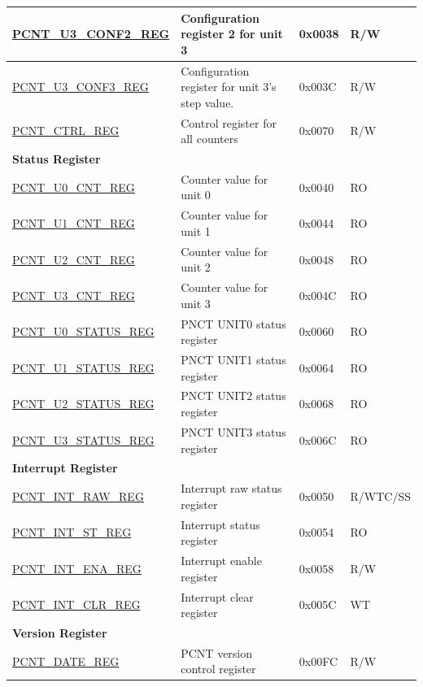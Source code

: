 \begin{longtable}{ | p{6cm} | p{7.2cm} | p{1.3cm} | p{1cm} | }
\hyperref[regdesc:PCNTUNCONF2REG]{PCNT\_U3\_CONF2\_REG} & Configuration register 2 for unit 3 & 0x0038 & R/W \\ \hline
\hyperref[regdesc:PCNTUNCONF3REG]{PCNT\_U3\_CONF3\_REG} & Configuration register for unit 3's step value. & 0x003C & R/W \\ \hline
\hyperref[regdesc:PCNTCTRLREG]{PCNT\_CTRL\_REG} & Control register for all counters & 0x0070 & R/W \\ \hline
\multicolumn{4}{|l|}{\textbf{Status Register}} \\ \hline
\hyperref[regdesc:PCNTUNCNTREG]{PCNT\_U0\_CNT\_REG} & Counter value for unit 0 & 0x0040 & RO \\ \hline
\hyperref[regdesc:PCNTUNCNTREG]{PCNT\_U1\_CNT\_REG} & Counter value for unit 1 & 0x0044 & RO \\ \hline
\hyperref[regdesc:PCNTUNCNTREG]{PCNT\_U2\_CNT\_REG} & Counter value for unit 2 & 0x0048 & RO \\ \hline
\hyperref[regdesc:PCNTUNCNTREG]{PCNT\_U3\_CNT\_REG} & Counter value for unit 3 & 0x004C & RO \\ \hline
\hyperref[regdesc:PCNTUNSTATUSREG]{PCNT\_U0\_STATUS\_REG} & PNCT UNIT0 status register & 0x0060 & RO \\ \hline
\hyperref[regdesc:PCNTUNSTATUSREG]{PCNT\_U1\_STATUS\_REG} & PNCT UNIT1 status register & 0x0064 & RO \\ \hline
\hyperref[regdesc:PCNTUNSTATUSREG]{PCNT\_U2\_STATUS\_REG} & PNCT UNIT2 status register & 0x0068 & RO \\ \hline
\hyperref[regdesc:PCNTUNSTATUSREG]{PCNT\_U3\_STATUS\_REG} & PNCT UNIT3 status register & 0x006C & RO \\ \hline
\multicolumn{4}{|l|}{\textbf{Interrupt Register}} \\ \hline
\hyperref[regdesc:PCNTINTRAWREG]{PCNT\_INT\_RAW\_REG} & Interrupt raw status register & 0x0050 & R/WTC/SS \\ \hline
\hyperref[regdesc:PCNTINTSTREG]{PCNT\_INT\_ST\_REG} & Interrupt status register & 0x0054 & RO \\ \hline
\hyperref[regdesc:PCNTINTENAREG]{PCNT\_INT\_ENA\_REG} & Interrupt enable register & 0x0058 & R/W \\ \hline
\hyperref[regdesc:PCNTINTCLRREG]{PCNT\_INT\_CLR\_REG} & Interrupt clear register & 0x005C & WT \\ \hline
\multicolumn{4}{|l|}{\textbf{Version Register}} \\ \hline
\hyperref[regdesc:PCNTDATEREG]{PCNT\_DATE\_REG} & PCNT version control register & 0x00FC & R/W \\ \hline
\end{longtable}

